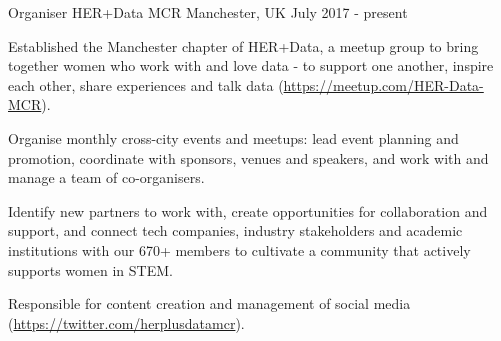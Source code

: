 \begin{cventries}
{\begin{cvitems}
      \end{cvitems}
    }    
\cventry
    {Organiser}
    {HER+Data MCR}
    {Manchester, UK}
    {July 2017 - present}
    {
      \begin{cvitems}
        \item {Established the Manchester chapter of HER+Data, a meetup group to bring together women who work with and love data - to support one another, inspire each other, share experiences and talk data (\url{https://meetup.com/HER-Data-MCR}).}
        \item {Organise monthly cross-city events and meetups: lead event planning and promotion, coordinate with sponsors, venues and speakers, and work with and manage a team of co-organisers.}
        \item {Identify new partners to work with, create opportunities for collaboration and support, and connect tech companies, industry stakeholders and academic institutions with our 670+ members to cultivate a community that actively supports women in STEM.}
        \item {Responsible for content creation and management of social media (\url{https://twitter.com/herplusdatamcr}).}
      \end{cvitems}
    }
\end{cventries}

